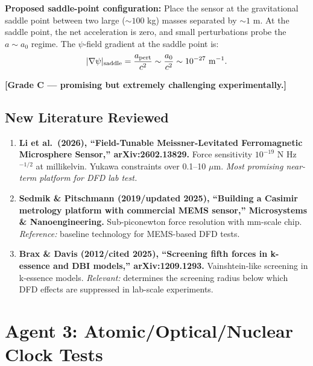 \documentclass[11pt]{article}
\newcommand{\aM}{a_0}
\begin{document}
\textbf{Proposed saddle-point configuration:} Place the sensor at
the gravitational saddle point between two large ($\sim 100$ kg)
masses separated by $\sim 1$ m. At the saddle point, the net
acceleration is zero, and small perturbations probe the $a \sim \aM$
regime. The $\psi$-field gradient at the saddle point is:
\begin{equation}
  |\nabla\psi|_{\rm saddle} = \frac{a_{\rm pert}}{c^2} \sim
  \frac{\aM}{c^2} \sim 10^{-27} \text{ m}^{-1}.
\end{equation}

\textbf{[Grade C --- promising but extremely challenging experimentally.]}

\subsection{New Literature Reviewed}

\begin{tcolorbox}[colback=green!5!white, colframe=green!50!black,
  title=\textbf{Agent 2: NEW LITERATURE REVIEWED}]

\begin{enumerate}

\item \textbf{Li et al.\ (2026), ``Field-Tunable Meissner-Levitated
  Ferromagnetic Microsphere Sensor,'' arXiv:2602.13829.}
  Force sensitivity $10^{-19}$ N Hz$^{-1/2}$ at millikelvin. Yukawa
  constraints over 0.1--10 $\mu$m. \emph{Most promising near-term
  platform for DFD lab test.}

\item \textbf{Sedmik \& Pitschmann (2019/updated 2025), ``Building a
  Casimir metrology platform with commercial MEMS sensor,''
  Microsystems \& Nanoengineering.}
  Sub-piconewton force resolution with mm-scale chip. \emph{Reference:}
  baseline technology for MEMS-based DFD tests.

\item \textbf{Brax \& Davis (2012/cited 2025), ``Screening fifth forces
  in k-essence and DBI models,'' arXiv:1209.1293.}
  Vainshtein-like screening in k-essence models. \emph{Relevant:}
  determines the screening radius below which DFD effects are suppressed
  in lab-scale experiments.

\end{enumerate}
\end{tcolorbox}

\section{Agent 3: Atomic/Optical/Nuclear Clock Tests}
\end{document}

